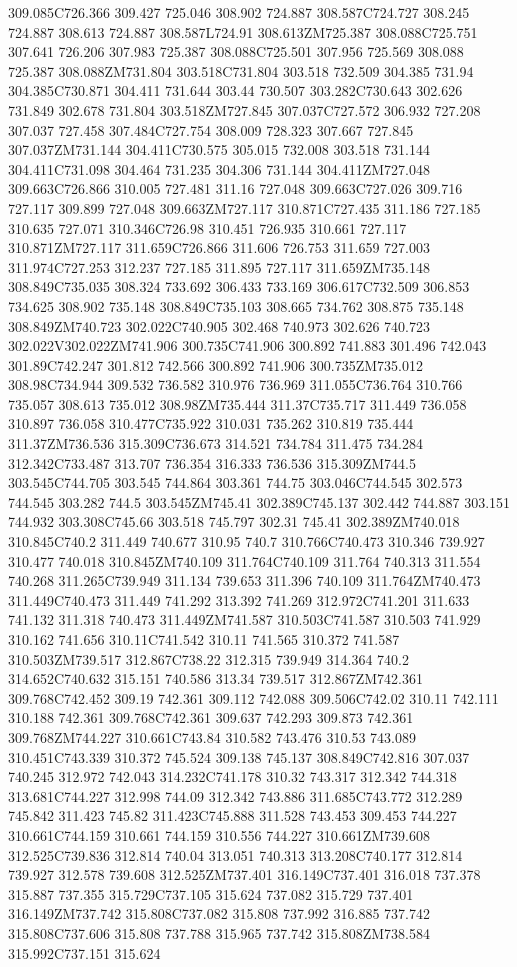 309.085C726.366 309.427 725.046 308.902 724.887 308.587C724.727 308.245 724.887 308.613 724.887 308.587L724.91 308.613ZM725.387 308.088C725.751 307.641 726.206 307.983 725.387 308.088C725.501 307.956 725.569 308.088 725.387 308.088ZM731.804 303.518C731.804 303.518 732.509 304.385 731.94 304.385C730.871 304.411 731.644 303.44 730.507 303.282C730.643 302.626 731.849 302.678 731.804 303.518ZM727.845 307.037C727.572 306.932 727.208 307.037 727.458 307.484C727.754 308.009 728.323 307.667 727.845 307.037ZM731.144 304.411C730.575 305.015 732.008 303.518 731.144 304.411C731.098 304.464 731.235 304.306 731.144 304.411ZM727.048 309.663C726.866 310.005 727.481 311.16 727.048 309.663C727.026 309.716 727.117 309.899 727.048 309.663ZM727.117 310.871C727.435 311.186 727.185 310.635 727.071 310.346C726.98 310.451 726.935 310.661 727.117 310.871ZM727.117 311.659C726.866 311.606 726.753 311.659 727.003 311.974C727.253 312.237 727.185 311.895 727.117 311.659ZM735.148 308.849C735.035 308.324 733.692 306.433 733.169 306.617C732.509 306.853 734.625 308.902 735.148 308.849C735.103 308.665 734.762 308.875 735.148 308.849ZM740.723 302.022C740.905 302.468 740.973 302.626 740.723 302.022V302.022ZM741.906 300.735C741.906 300.892 741.883 301.496 742.043 301.89C742.247 301.812 742.566 300.892 741.906 300.735ZM735.012 308.98C734.944 309.532 736.582 310.976 736.969 311.055C736.764 310.766 735.057 308.613 735.012 308.98ZM735.444 311.37C735.717 311.449 736.058 310.897 736.058 310.477C735.922 310.031 735.262 310.819 735.444 311.37ZM736.536 315.309C736.673 314.521 734.784 311.475 734.284 312.342C733.487 313.707 736.354 316.333 736.536 315.309ZM744.5 303.545C744.705 303.545 744.864 303.361 744.75 303.046C744.545 302.573 744.545 303.282 744.5 303.545ZM745.41 302.389C745.137 302.442 744.887 303.151 744.932 303.308C745.66 303.518 745.797 302.31 745.41 302.389ZM740.018 310.845C740.2 311.449 740.677 310.95 740.7 310.766C740.473 310.346 739.927 310.477 740.018 310.845ZM740.109 311.764C740.109 311.764 740.313 311.554 740.268 311.265C739.949 311.134 739.653 311.396 740.109 311.764ZM740.473 311.449C740.473 311.449 741.292 313.392 741.269 312.972C741.201 311.633 741.132 311.318 740.473 311.449ZM741.587 310.503C741.587 310.503 741.929 310.162 741.656 310.11C741.542 310.11 741.565 310.372 741.587 310.503ZM739.517 312.867C738.22 312.315 739.949 314.364 740.2 314.652C740.632 315.151 740.586 313.34 739.517 312.867ZM742.361 309.768C742.452 309.19 742.361 309.112 742.088 309.506C742.02 310.11 742.111 310.188 742.361 309.768C742.361 309.637 742.293 309.873 742.361 309.768ZM744.227 310.661C743.84 310.582 743.476 310.53 743.089 310.451C743.339 310.372 745.524 309.138 745.137 308.849C742.816 307.037 740.245 312.972 742.043 314.232C741.178 310.32 743.317 312.342 744.318 313.681C744.227 312.998 744.09 312.342 743.886 311.685C743.772 312.289 745.842 311.423 745.82 311.423C745.888 311.528 743.453 309.453 744.227 310.661C744.159 310.661 744.159 310.556 744.227 310.661ZM739.608 312.525C739.836 312.814 740.04 313.051 740.313 313.208C740.177 312.814 739.927 312.578 739.608 312.525ZM737.401 316.149C737.401 316.018 737.378 315.887 737.355 315.729C737.105 315.624 737.082 315.729 737.401 316.149ZM737.742 315.808C737.082 315.808 737.992 316.885 737.742 315.808C737.606 315.808 737.788 315.965 737.742 315.808ZM738.584 315.992C737.151 315.624 